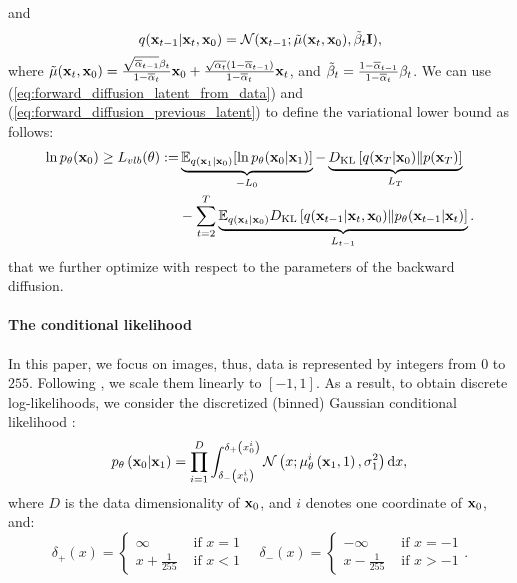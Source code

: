 and 
\begin{equation}\label{eq:forward_diffusion_previous_latent}
q(\rvx_{t-1}|\rvx_{t}, \rvx_0) = \mathcal{N}(\rvx_{t-1}; \Tilde{\mu}(\rvx_t, \rvx_0), \Tilde{\beta}_t \mathbf{I}) ,
\end{equation}
where $\Tilde{\mu}({\mathbf{x}}_t, {\mathbf{x}}_0) = \frac{\sqrt{\overline{\alpha}_{t-1}} \beta_{t}}{1-\overline{\alpha}_{t}} {\mathbf{x}}_0 + \frac{\sqrt{\alpha_{t}}\left(1-\overline{\alpha}_{t-1}\right)}{1-\overline{\alpha}_{t}} {\mathbf{x}}_{t}$, 
and $\Tilde{\beta}_{t}=\frac{1-\overline{\alpha}_{t-1}}{1-\overline{\alpha}_{t}} \beta_{t}$. We can use (\ref{eq:forward_diffusion_latent_from_data}) and (\ref{eq:forward_diffusion_previous_latent}) to define the variational lower bound as follows:
\begin{align} \label{eq:diff_elbo}
    \ln p_{\theta}(\rvx_0) \geq L_{vlb}(\theta) := &\underbrace{\E_{q(\rvx_1|\rvx_0)}[\ln p_{\theta}(\rvx_0|\rvx_1)]}_{-L_0} - \underbrace{\KL{q(\rvx_T |\rvx_0)}{p(\rvx_T)}}_{L_T} \notag \\
    & - \sum_{t=2}^T \underbrace{\E_{q(\rvx_t|\rvx_0)} \KL{q(\rvx_{t-1}|\rvx_t, \rvx_0)}{p_{\theta}(\rvx_{t-1}|\rvx_t)}}_{L_{t-1}}.
\end{align}
that we further optimize with respect to the parameters of the backward diffusion.

\paragraph{The conditional likelihood} 
In this paper, we focus on images, thus, data is represented by integers from $0$ to $255$. Following \cite{ho2020denoising}, we scale them linearly to $[-1, 1]$. As a result, to obtain discrete log-likelihoods, we consider the discretized (binned) Gaussian conditional likelihood \cite{ho2020denoising}:
\begin{equation}\label{eq:discretized_Gaussian}
    p_{\theta}\left(\rvx_{0} | \rvx_{1}\right)=\prod_{i=1}^{D} \int_{\delta_{-}\left(x_{0}^{i}\right)}^{\delta_{+}\left(x_{0}^{i}\right)} \mathcal{N}\left(x ; \mu_{\theta}^{i}\left(\mathbf{x}_{1}, 1\right), \sigma_{1}^{2}\right) \mathrm{d} x, 
\end{equation}
where $D$ is the data dimensionality of ${\mathbf{x}}_0$, and $i$ denotes one coordinate of ${\mathbf{x}}_0$, and:
\begin{equation}
    \delta_{+}(x)=\left\{\begin{array}{ll}
\infty & \text { if } x=1 \\
x+\frac{1}{255} & \text { if } x<1
\end{array} \quad \delta_{-}(x)= \begin{cases}-\infty & \text { if } x=-1 \\
x-\frac{1}{255} & \text { if } x>-1\end{cases}\right. .
\end{equation}

